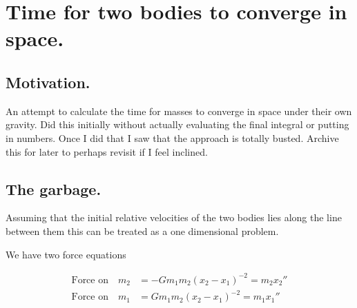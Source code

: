 
%
%




\chapter{Time for two bodies to converge in space. }
\label{chap:twobodies}
\date{ Dec 15, 2008.  $RCSfile: twobodies.tex,v $ Last $Revision: 1.10 $ $Date: 2009/06/14 23:51:45 $ }

%



\section{Motivation.}

An attempt to calculate the time for masses to converge in space under their own gravity.  Did this initially without actually evaluating the final
integral or putting in numbers.  Once I did that I saw that the approach is totally busted.  Archive this for later to perhaps revisit if I feel
inclined.

\section{The garbage. }

Assuming that the initial relative velocities of the two bodies lies along
the line between them this can be treated as a one dimensional problem.

We have two force equations

\begin{align*}
\text{Force on} \quad m_2 &= - G m_1 m_2 (x_2 - x_1)^{-2} = m_2 {x_2}'' \\
\text{Force on} \quad m_1 &=  G m_1 m_2 (x_2 - x_1)^{-2} = m_1 {x_1}''
\end{align*}

